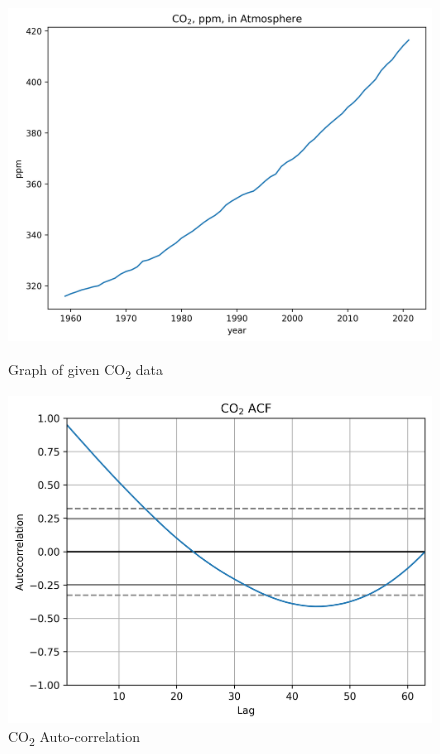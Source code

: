 \documentclass{mcmthesis}
\begin{document}
    \begin{figure}[h]
        \centering
        \begin{minipage}{.5\textwidth}
            \centering
            \includegraphics[width=\textwidth]{co2}
            \caption{Graph of given CO\textsubscript{2} data}
            \label{fig:co2}
        \end{minipage}%
        \begin{minipage}{.5\textwidth}
            \centering
            \includegraphics[width=\textwidth]{co2_acf}
            \caption{CO\textsubscript{2} Auto-correlation}
            \label{fig:co2_acf}
        \end{minipage}
    \end{figure}
\end{document}
